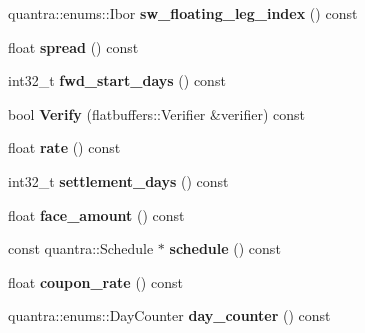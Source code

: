 \begin{DoxyCompactItemize}
quantra\+::enums\+::\+Ibor {\bfseries sw\+\_\+floating\+\_\+leg\+\_\+index} () const
\item 
\mbox{\label{structquantra_1_1FLATBUFFERS__FINAL__CLASS_a4653ad5df3a925e6588a0b6003cd51de}} 
float {\bfseries spread} () const
\item 
\mbox{\label{structquantra_1_1FLATBUFFERS__FINAL__CLASS_a58bfec8d554367776ab0c308d1414be4}} 
int32\+\_\+t {\bfseries fwd\+\_\+start\+\_\+days} () const
\item 
\mbox{\label{structquantra_1_1FLATBUFFERS__FINAL__CLASS_aed693ee5a45b5f53af7411f9cab6793a}} 
bool {\bfseries Verify} (flatbuffers\+::\+Verifier \&verifier) const
\item 
\mbox{\label{structquantra_1_1FLATBUFFERS__FINAL__CLASS_aa5a25f3bfb8a4b4822cb5fcb1b479ff8}} 
float {\bfseries rate} () const
\item 
\mbox{\label{structquantra_1_1FLATBUFFERS__FINAL__CLASS_a2f95c4a4ab25cb17f5252fd7e6962827}} 
int32\+\_\+t {\bfseries settlement\+\_\+days} () const
\item 
\mbox{\label{structquantra_1_1FLATBUFFERS__FINAL__CLASS_a337f006a00696676f3a1521958276b25}} 
float {\bfseries face\+\_\+amount} () const
\item 
\mbox{\label{structquantra_1_1FLATBUFFERS__FINAL__CLASS_a4980a75c547328bfac97fa23df17d655}} 
const quantra\+::\+Schedule $\ast$ {\bfseries schedule} () const
\item 
\mbox{\label{structquantra_1_1FLATBUFFERS__FINAL__CLASS_aa2f146b82509ff6e744924f478f954e5}} 
float {\bfseries coupon\+\_\+rate} () const
\item 
\mbox{\label{structquantra_1_1FLATBUFFERS__FINAL__CLASS_a955b9a33f908db3b82dea98242bc214e}} 
quantra\+::enums\+::\+Day\+Counter {\bfseries day\+\_\+counter} () const

\end{DoxyCompactItemize}
